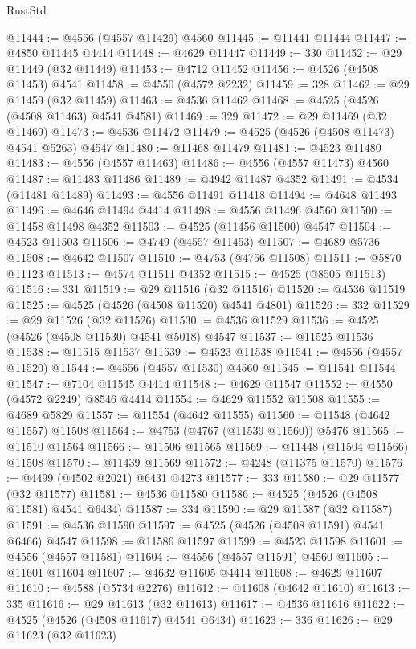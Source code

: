 \begin{lexlean}{RustStd}
\begin{coremodule}
@11444 := @4556 (@4557 @11429) @4560
@11445 := @11441 @11444
@11447 := @4850 @11445 @4414
@11448 := @4629 @11447
@11449 := 330
@11452 := @29 @11449 (@32 @11449)
@11453 := @4712 @11452
@11456 := @4526 (@4508 @11453) @4541
@11458 := @4550 (@4572 @2232)
@11459 := 328
@11462 := @29 @11459 (@32 @11459)
@11463 := @4536 @11462
@11468 := @4525 (@4526 (@4508 @11463) @4541 @4581)
@11469 := 329
@11472 := @29 @11469 (@32 @11469)
@11473 := @4536 @11472
@11479 := @4525 (@4526 (@4508 @11473) @4541 @5263) @4547
@11480 := @11468 @11479
@11481 := @4523 @11480
@11483 := @4556 (@4557 @11463)
@11486 := @4556 (@4557 @11473) @4560
@11487 := @11483 @11486
@11489 := @4942 @11487 @4352
@11491 := @4534 (@11481 @11489)
@11493 := @4556 @11491 @11418
@11494 := @4648 @11493
@11496 := @4646 @11494 @4414
@11498 := @4556 @11496 @4560
@11500 := @11458 @11498 @4352
@11503 := @4525 (@11456 @11500) @4547
@11504 := @4523 @11503
@11506 := @4749 (@4557 @11453)
@11507 := @4689 @5736
@11508 := @4642 @11507
@11510 := @4753 (@4756 @11508)
@11511 := @5870 @11123
@11513 := @4574 @11511 @4352
@11515 := @4525 (@8505 @11513)
@11516 := 331
@11519 := @29 @11516 (@32 @11516)
@11520 := @4536 @11519
@11525 := @4525 (@4526 (@4508 @11520) @4541 @4801)
@11526 := 332
@11529 := @29 @11526 (@32 @11526)
@11530 := @4536 @11529
@11536 := @4525 (@4526 (@4508 @11530) @4541 @5018) @4547
@11537 := @11525 @11536
@11538 := @11515 @11537
@11539 := @4523 @11538
@11541 := @4556 (@4557 @11520)
@11544 := @4556 (@4557 @11530) @4560
@11545 := @11541 @11544
@11547 := @7104 @11545 @4414
@11548 := @4629 @11547
@11552 := @4550 (@4572 @2249) @8546 @4414
@11554 := @4629 @11552 @11508
@11555 := @4689 @5829
@11557 := @11554 (@4642 @11555)
@11560 := @11548 (@4642 @11557) @11508
@11564 := @4753 (@4767 (@11539 @11560)) @5476
@11565 := @11510 @11564
@11566 := @11506 @11565
@11569 := @11448 (@11504 @11566) @11508
@11570 := @11439 @11569
@11572 := @4248 (@11375 @11570)
@11576 := @4499 (@4502 @2021) @6431 @4273
@11577 := 333
@11580 := @29 @11577 (@32 @11577)
@11581 := @4536 @11580
@11586 := @4525 (@4526 (@4508 @11581) @4541 @6434)
@11587 := 334
@11590 := @29 @11587 (@32 @11587)
@11591 := @4536 @11590
@11597 := @4525 (@4526 (@4508 @11591) @4541 @6466) @4547
@11598 := @11586 @11597
@11599 := @4523 @11598
@11601 := @4556 (@4557 @11581)
@11604 := @4556 (@4557 @11591) @4560
@11605 := @11601 @11604
@11607 := @4632 @11605 @4414
@11608 := @4629 @11607
@11610 := @4588 (@5734 @2276)
@11612 := @11608 (@4642 @11610)
@11613 := 335
@11616 := @29 @11613 (@32 @11613)
@11617 := @4536 @11616
@11622 := @4525 (@4526 (@4508 @11617) @4541 @6434)
@11623 := 336
@11626 := @29 @11623 (@32 @11623)

\end{coremodule}
\end{lexlean}
